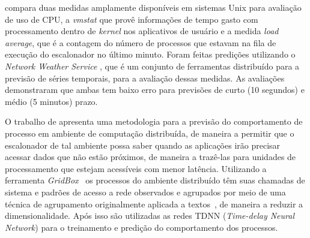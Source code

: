  compara duas medidas amplamente disponíveis
em sistemas Unix para avaliação de uso de CPU, a \emph{vmstat} que provê
informações de tempo gasto com processamento dentro de \emph{kernel} nos
aplicativos de usuário e a medida \emph{load average}, que é a contagem do
número de processos que estavam na fila de execução do escalonador no último
minuto. Foram feitas predições utilizando o \emph{Network Weather Service}
\cite{wolski1999network}, que é um conjunto de ferramentas distribuído para a
previsão de séries temporais, para a avaliação dessas medidas. As avaliações
demonstraram que ambas tem baixo erro para previsões de curto (10 segundos) e
médio (5 minutos) prazo.

O trabalho de  apresenta uma metodologia para a
previsão do comportamento de processo em ambiente de computação distribuída, de
maneira a permitir que o escalonador de tal ambiente possa saber quando as
aplicações irão precisar acessar dados que não estão próximos, de maneira a
trazê-las para unidades de processamento que estejam acessíveis com menor
latência. Utilizando a ferramenta \emph{GridBox}~\cite{dodonov2004gridbox} os
processos do ambiente distribuído têm suas chamadas de sistema e padrões de
acesso a rede observados e agrupados por meio de uma técnica de agrupamento
originalmente aplicada a textos~\cite{de2005automatic}, de maneira a reduzir a
dimensionalidade. Após isso são utilizadas as redes TDNN (\emph{Time-delay
Neural Network}) para o treinamento e predição do comportamento dos processos.

